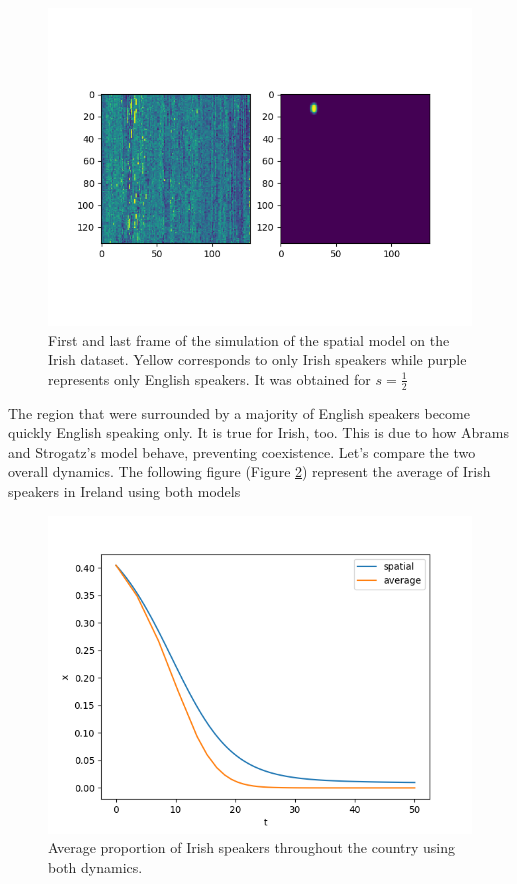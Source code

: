 \documentclass{article}
\begin{document}
\begin{figure}[H]
\centering
\includegraphics[scale=0.5]{firstandlast_ir.png}
\caption{First and last frame of the simulation of the spatial model on the Irish dataset. Yellow corresponds to only Irish speakers while purple represents only English speakers. It was obtained for $s=\frac{1}{2}$}
\label{fig:firstandlast_ir}
\end{figure}

The region that were surrounded by a majority of English speakers become quickly English speaking only.
It is true for Irish, too.
This is due to how Abrams and Strogatz's model behave, preventing coexistence.
Let's compare the two overall dynamics.
The following figure (Figure \ref{fig:overall}) represent the average of Irish speakers in Ireland using both models

\begin{figure}[H]
\centering
\includegraphics[scale=0.5]{overall_dyn_ir.png}
\caption{Average proportion of Irish speakers throughout the country using both dynamics.}
\label{fig:overall}
\end{figure}
\end{document}
